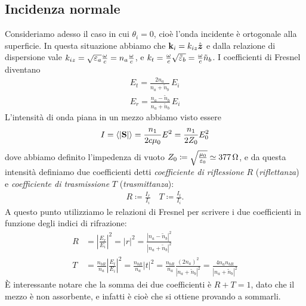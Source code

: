 \subsection{Incidenza normale}
Consideriamo adesso il caso in cui $ \theta_i = 0 $, cioè l'onda incidente è ortogonale alla superficie. In questa situazione abbiamo che 
$ \mathbf{k}_i = k_{iz} \hat{\boldsymbol{z}} $ e dalla relazione di dispersione vale $ k_{iz} = \sqrt{\varepsilon_a} \frac{\omega}{c} = n_a \frac{\omega}{c} $, e 
$ k_t = \frac{\omega}{c} \sqrt{\tilde{\varepsilon}_b} = \frac{\omega}{c} \tilde{n}_b $. I coefficienti di Fresnel diventano
\begin{align}
  E_t = \frac{2n_a}{n_a + \tilde{n}_b}\, E_i
  \\
  E_r = \frac{n_a - \tilde{n}_b}{n_a + \tilde{n}_b}\, E_i
\end{align}
L'intensità di onda piana in un mezzo abbiamo visto essere
\begin{align}
  I = \langle |\mathbf{S}| \rangle = \frac{n_1}{2 c \mu_0} E^2 = \frac{n_1}{2 Z_0} E_0^2
\end{align}
dove abbiamo definito l'impedenza di vuoto $ Z_0 \coloneq \sqrt{\frac{\mu_0}{\varepsilon_0}} \simeq \SI{377}{\ohm} $, 
e da questa intensità definiamo due coefficienti detti \textit{coefficiente di riflessione} $ R $ (\textit{riflettanza}) e 
\textit{coefficiente di trasmissione} $ T $ (\textit{trasmittanza}):
\begin{align}
  R \coloneq \frac{I_r}{I_i} \quad T \coloneq \frac{I_t}{I_i}.
\end{align}
A questo punto utilizziamo le relazioni di Fresnel per scrivere i due coefficienti in funzione degli indici di rifrazione:
\begin{align}
  R &= \left| \frac{E_r}{E_i} \right|^2 = |r|^2 = \frac{|n_a - \tilde{n}_b|^2}{|n_a + \tilde{n}_b|^2}
  \\
  T &= \frac{n_{bR}}{n_a} \left| \frac{E_t}{E_i} \right|^2 = \frac{n_{bR}}{n_a} |t|^2 = \frac{n_{bR}}{n_a} \frac{(2n_a)^2}{|n_a + \tilde{n}_b|^2} 
  = \frac{4 n_a n_{bR}}{|n_a + \tilde{n}_b|^2}
\end{align}
È interessante notare che la somma dei due coefficienti è $ R + T = 1 $, dato che il mezzo è non assorbente, e infatti è cioè che si ottiene provando a 
sommarli.

\appendix

